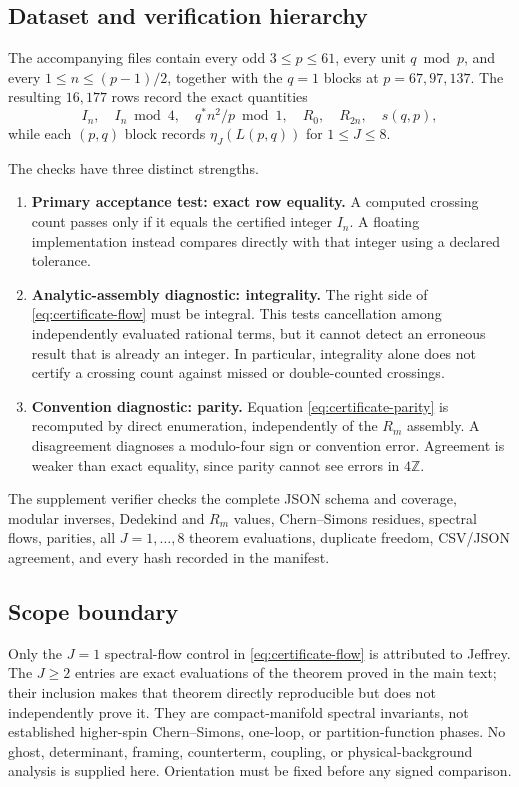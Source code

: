 \subsection{Dataset and verification hierarchy}

The accompanying files contain every odd $3\leq p\leq61$, every unit
$q\bmod p$, and every $1\leq n\leq(p-1)/2$, together with the $q=1$ blocks
at $p=67,97,137$.  The resulting $16{,}177$ rows record the exact quantities
\[
 I_n,\quad I_n\bmod4,\quad q^*n^2/p\bmod1,\quad
 R_0,\quad R_{2n},\quad s(q,p),
\]
while each $(p,q)$ block records $\eta_J(L(p,q))$ for $1\leq J\leq8$.

The checks have three distinct strengths.

\begin{enumerate}
\item \textbf{Primary acceptance test: exact row equality.}
A computed crossing count passes only if it equals the certified integer
$I_n$.  A floating implementation instead compares directly with that
integer using a declared tolerance.

\item \textbf{Analytic-assembly diagnostic: integrality.}
The right side of \eqref{eq:certificate-flow} must be integral.  This tests
cancellation among independently evaluated rational terms, but it cannot
detect an erroneous result that is already an integer.  In particular,
integrality alone does not certify a crossing count against missed or
double-counted crossings.

\item \textbf{Convention diagnostic: parity.}
Equation \eqref{eq:certificate-parity} is recomputed by direct enumeration,
independently of the $R_m$ assembly.  A disagreement diagnoses a modulo-four
sign or convention error.  Agreement is weaker than exact equality, since
parity cannot see errors in $4\mathbb Z$.
\end{enumerate}

The supplement verifier checks the complete JSON schema and coverage, modular
inverses, Dedekind and $R_m$ values, Chern--Simons residues, spectral flows,
parities, all $J=1,\ldots,8$ theorem evaluations, duplicate freedom,
CSV/JSON agreement, and every hash recorded in the manifest.

\subsection{Scope boundary}

Only the $J=1$ spectral-flow control in \eqref{eq:certificate-flow} is
attributed to Jeffrey.  The $J\geq2$ entries are exact evaluations of the
theorem proved in the main text; their inclusion makes that theorem directly
reproducible but does not independently prove it.  They are compact-manifold
spectral invariants, not established higher-spin Chern--Simons, one-loop, or
partition-function phases.  No ghost, determinant, framing, counterterm,
coupling, or physical-background analysis is supplied here.  Orientation must
be fixed before any signed comparison.
